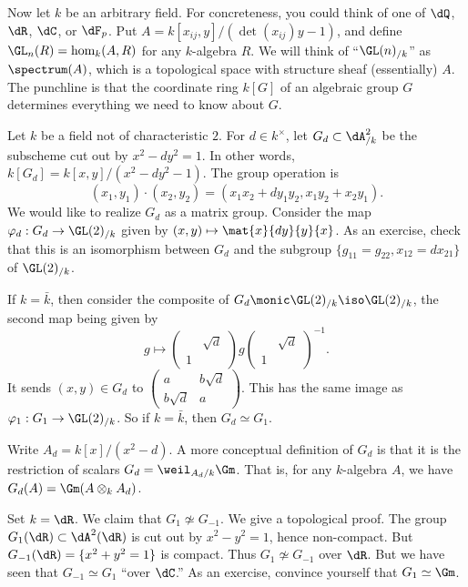 Now let $k$ be an arbitrary field. For concreteness, you could think of one of 
$\dQ$, $\dR$, $\dC$, or $\dF_p$. Put $A=k[x_{i j},y]/(\det(x_{i j}) y-1)$, and 
define $\GL_n(R)=\hom_k(A,R)$ for any $k$-algebra $R$. We will think of 
``$\GL(n)_{/k}$'' as $\spectrum(A)$, which is a topological space with structure 
sheaf (essentially) $A$. The punchline is that the coordinate ring 
$k[G]$ of an algebraic group $G$ determines everything we need to know about 
$G$. 

\begin{example}
Let $k$ be a field not of characteristic $2$. For $d\in k^\times$, let 
$G_d\subset \dA_{/k}^2$ be the subscheme cut out by $x^2-d y^2=1$. In 
other words, $k[G_d]=k[x,y]/(x^2-d y^2-1)$. The group operation is 
\[
  (x_1,y_1)\cdot (x_2,y_2) = (x_1 x_2+d y_1 y_2, x_1 y_2+x_2 y_1) .
\]
We would like to realize $G_d$ as a matrix group. Consider the map 
$\varphi_d:G_d\to \GL(2)_{/k}$ given by 
$(x,y)\mapsto \mat{x}{dy}{y}{x}$. As an exercise, 
check that this is an isomorphism between $G_d$ and the subgroup 
$\{g_{11}=g_{22},x_{12}=d x_{21}\}$ of $\GL(2)_{/k}$. 

If $k=\bar k$, then consider the composite of $G_d\monic \GL(2)_{/k}\iso \GL(2)_{/k}$, 
the second map being given by 
\[
  g\mapsto \begin{pmatrix} & \sqrt d \\ 1 \end{pmatrix} g \begin{pmatrix} & \sqrt d \\ 1 \end{pmatrix}^{-1} .
\]
It sends $(x,y)\in G_d$ to $\begin{pmatrix} a & b\sqrt d \\ b\sqrt d & a \end{pmatrix}$. 
This has the same image as $\varphi_1:G_1\to \GL(2)_{/k}$. So if $k=\bar k$, then 
$G_d\simeq G_1$. 
\end{example}

\begin{hard}
Write $A_d=k[x]/(x^2-d)$. A more conceptual definition of $G_d$ is that it is 
the restriction of scalars $G_d=\weil_{A_d/k} \Gm$. That is, for any 
$k$-algebra $A$, we have $G_d(A) = \Gm(A\otimes_k A_d)$. 
\end{hard}

\begin{example}
Set $k=\dR$. We claim that $G_1\not\simeq G_{-1}$. We give a topological 
proof. The group $G_1(\dR)\subset \dA^2(\dR)$ is cut out by $x^2-y^2=1$, hence 
non-compact. But $G_{-1}(\dR)=\{x^2+y^2=1\}$ is compact. Thus 
$G_1\not\simeq G_{-1}$ over $\dR$. 
But we have seen that $G_{-1}\simeq G_1$ ``over $\dC$.'' As an exercise, 
convince yourself that $G_1\simeq \Gm$. 
\end{example}

